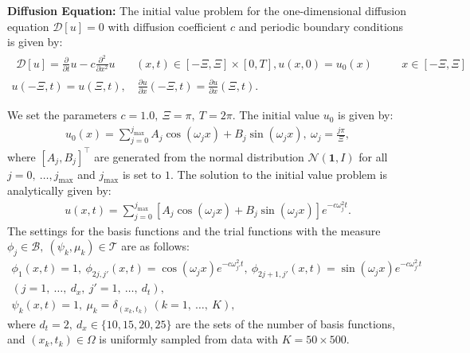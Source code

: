 \documentclass{article}
\theoremstyle{plain}
\theoremstyle{definition}
\theoremstyle{remark}
\begin{document}
\textbf{Diffusion Equation:} The initial value problem for the one-dimensional diffusion equation \(\mathscr{D}[u]=0\) with diffusion coefficient \( c \) and periodic boundary conditions is given by:
\begin{gather*}
\begin{aligned}
\mathscr{D}[u] = \frac{\partial}{\partial t} u - c\frac{\partial^2}{\partial x^2} u & \ & (x, t) \in [-\Xi, \Xi] \times [0, T],
u(x, 0)=u_0(x) & \quad & x \in [- \Xi, \Xi]
\end{aligned} \\
u\left(- \Xi,t\right)=u\left( \Xi,t\right),\quad \frac{\partial u}{\partial x}\left(- \Xi, t\right)= \frac{\partial u}{\partial x}\left( \Xi, t\right).
\end{gather*}

We set the parameters \(c = 1.0,\ \Xi = \pi,\ T=2\pi\). The initial value \(u_0\) is given by:
\begin{align}
    \label{eq:diffusion-init}
    u_0(x) = \sum_{j=0}^{j_{\mathrm{max}}} A_j \cos\left(\omega_j x\right)+B_j \sin\left(\omega_j x\right),\ \omega_j = \frac{j\pi}{\Xi},
\end{align}
where \([A_j, B_j]^{\top}\) are generated from the normal distribution \(\mathcal{N}(\bm{1}, I)\) for all \(j = 0,\ \ldots, j_{\mathrm{max}}\) and \(j_{\mathrm{max}}\) is set to \(1\).
The solution to the initial value problem is analytically given by:
\begin{align*}
    u(x, t) = \sum_{j=0}^{j_{\mathrm{max}}}\left[A_j \cos\left(\omega_j x\right)+B_j \sin\left(\omega_j x\right)\right] e^{-c \omega_j^2 t}.
\end{align*}
The settings for the basis functions and the trial functions with the measure \(\phi_j \in \mathcal{B},\ (\psi_k, \mu_k) \in \mathcal{T}\) are as follows:
\begin{gather*}
    \phi_1(x, t) = 1,\
    \phi_{2j, j'}(x, t) = \cos(\omega_j x) e^{-c\omega_{j'}^2 t},\ \phi_{2j+1, j'}(x, t) = \sin(\omega_j x) e^{-c \omega_{j'}^2 t} \\
    (j=1,\ \ldots,\ d_x,\ j' = 1,\ \ldots,\ d_t),\\
    \psi_k(x, t) = 1,\ \mu_k = \delta_{(x_k, t_k)} \ (k = 1,\ \ldots,\ K),
\end{gather*}
where \(d_t = 2,\ d_x \in \{10, 15, 20, 25\}\) are the sets of the number of basis functions, and \((x_k, t_k) \in \Omega\) is uniformly sampled from data with \(K = 50 \times 500\).
\end{document}
